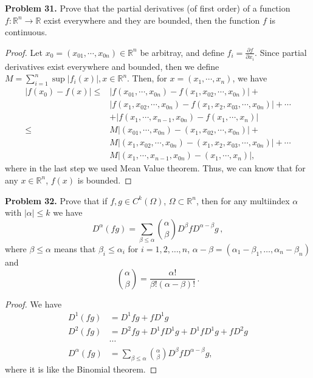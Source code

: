 \documentclass[12pt,leqno]{amsart}
\theoremstyle{definition}
\begin{document}
\medskip

\noindent
{\bf Problem 31.}
Prove that the partial derivatives (of first order) of a function
$f:\mathbb{R}^n\to\mathbb{R}$ exist everywhere and they are bounded, then
the function $f$ is continuous.
\begin{proof}
Let $x_0 = (x_{01},\cdots,x_{0n}) \in \mathbb{R}^n$ be arbitray, and define $f_i = \frac{\partial f}{\partial x_i}$. Since partial derivatives exist everywhere and bounded, then we define $M = \sum^n_{i=1}\sup |f_i(x)|, x\in \mathbb{R}^n$. Then, for $x = (x_1,\cdots,x_n)$, we have
\begin{align*}
    |f(x_0) - f(x)| \leq & |f(x_{01},\cdots,x_{0n}) - f(x_1, x_{02}, \cdots, x_{0n})| + \\
    & |f(x_1, x_{02}, \cdots, x_{0n}) - f(x_1, x_{2}, x_{03}, \cdots, x_{0n})| + \cdots  \\
    & + |f(x_{1},\cdots, x_{n-1}, x_{0n}) - f(x_1, \cdots, x_n)| \\
    \leq & M |(x_{01},\cdots,x_{0n}) - (x_1, x_{02}, \cdots, x_{0n})| + \\
    & M |(x_1, x_{02}, \cdots, x_{0n}) - (x_1, x_{2}, x_{03}, \cdots, x_{0n})| + \cdots  \\
    & M |(x_{1},\cdots, x_{n-1}, x_{0n}) - (x_1, \cdots, x_n)|,
\end{align*}
where in the last step we used Mean Value theorem. Thus, we can know that for any $x\in \mathbb{R}^n$, $f(x)$ is bounded.
\end{proof}

\medskip

\noindent
{\bf Problem 32.}
Prove that if $f,g\in C^k(\Omega)$, $\Omega\subset\mathbb{R}^n$, then for any multiindex
$\alpha$ with $|\alpha|\leq k$ we have
$$
D^\alpha(fg)=\sum_{\beta\leq \alpha}\binom{\alpha}{\beta}D^\beta f D^{\alpha-\beta}g\, ,
$$
where
$\beta\leq\alpha$ means that $\beta_i\leq\alpha_i$ for $i=1,2,\ldots,n$,
$\alpha-\beta=(\alpha_1-\beta_1,\ldots,\alpha_n-\beta_n)$ and 
$$
\binom{\alpha}{\beta}=\frac{\alpha!}{\beta!(\alpha-\beta)!}\, .
$$
\begin{proof}
We have
\begin{align*}
    D^1(fg) & = D^1f g + f D^1 g \\
    D^2(fg) & = D^2f g + D^1 f D^1 g + D^1 f D^1 g + f D^2 g \\
    & \cdots \\
    D^\alpha(fg) & = \sum_{\beta\leq \alpha}\binom{\alpha}{\beta}D^\beta f D^{\alpha-\beta}g,
\end{align*}
where it is like the Binomial theorem.
\end{proof}
\end{document}
